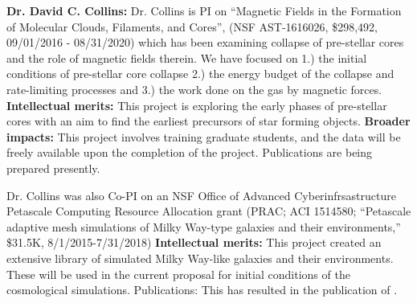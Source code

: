  
\textbf{Dr. David C. Collins:} Dr. Collins is PI on ``Magnetic Fields in the Formation of
Molecular Clouds, Filaments, and Cores'',  (NSF AST-1616026, \$298,492,
09/01/2016 - 08/31/2020)  which has been
examining collapse of pre-stellar cores and the role of magnetic fields therein.
We have focused on 1.) the initial conditions of pre-stellar core collapse 2.)
the energy budget of the collapse and rate-limiting processes and 3.) the work
done on the gas by magnetic forces.
\textbf{Intellectual merits:} This project is exploring the early phases of
pre-stellar cores with an aim to find the earliest precursors of star forming
objects.  \textbf{Broader impacts:} This project involves training graduate
students, and the data will be freely available upon the completion of the
project.  Publications are being prepared presently.

Dr. Collins was also Co-PI on 
an NSF Office of Advanced Cyberinfrsastructure
Petascale Computing Resource Allocation grant (PRAC; ACI 1514580;
``Petascale adaptive mesh simulations of Milky Way-type galaxies and
their environments,'' \$31.5K, 8/1/2015-7/31/2018)  \textbf{Intellectual
merits:} This project created an extensive library of simulated Milky Way-like
galaxies and their environments.  These will be used in the current proposal for
initial conditions of the cosmological simulations.  Publications: This has
resulted in the publication of \citet{Hummels19}.
